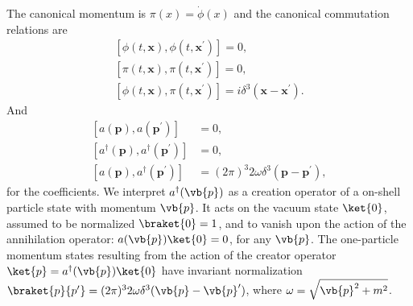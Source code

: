 The canonical momentum is $\pi(x)=\dot{\phi}(x)$ and the canonical commutation relations are
\begin{equation}
\begin{array}{l}
{\left[\phi(t,\mathbf{x}), \phi\left(t,\mathbf{x}^{\prime}\right)\right]=0}, \\
{\left[\pi(t,\mathbf{x}), \pi\left(t,\mathbf{x}^{\prime}\right)\right]=0}, \\
{\left[\phi(t,\mathbf{x}), \pi\left(t,\mathbf{x}^{\prime}\right)\right]=i \delta^3(\mathbf{x}-\mathbf{x}^{\prime})}.
\end{array}
\label{comu_fields}
\end{equation}
And
\begin{equation}
\begin{aligned}
\left[a(\mathbf{p}), a\left(\mathbf{p}^{\prime}\right)\right] &=0, \\
\left[a^{\dagger}(\mathbf{p}), a^{\dagger}\left(\mathbf{p}^{\prime}\right)\right] &=0 ,\\
\left[a(\mathbf{p}), a^{\dagger}\left(\mathbf{p}^{\prime}\right)\right] &=(2 \pi)^{3} 2 \omega \delta^3(\mathbf{p}-\mathbf{p}^{\prime}),
\label{commu_creators}
\end{aligned}
\end{equation}
for the coefficients. We interpret $a^\dagger(\vb{p})$ as a creation operator of a on-shell particle state with momentum $\vb{p}$. It acts on the vacuum state $\ket{0}$, assumed to be normalized $\braket{0}=1$, and to vanish upon the action of the annihilation operator: $a(\vb{p})\ket{0}=0$, for any $\vb{p}$. The one-particle momentum states resulting from the action of the creator operator $\ket{p}=a^\dagger(\vb{p})\ket{0}$ have invariant normalization $\braket{p}{p^\prime}=(2\pi)^32\omega\delta^3(\vb{p}-\vb{p}^\prime)$, where $\omega=\sqrt{\vb{p}^2+m^2}$.\\

